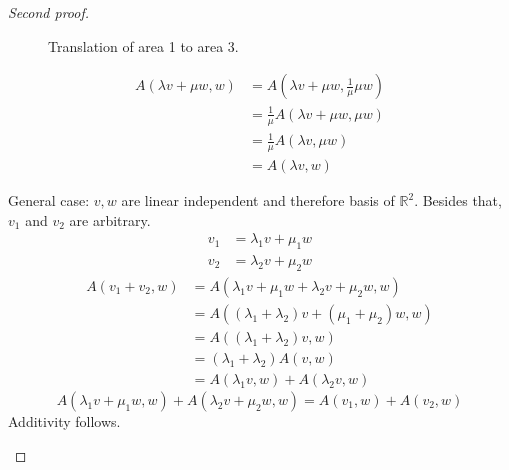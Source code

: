\documentclass[a4paper,landscape,twocolumn]{article}
\begin{document}
\begin{proof}[Second proof]
\begin{enumerate}
\begin{figure}[!h]
\begin{center}
          \caption{Translation of area 1 to area 3.}
          \label{img:pt}
        \end{center}
      \end{figure}
      \begin{align*}
        A(\lambda v + \mu w, w)
          &= A(\lambda v + \mu w, \frac{1}{\mu} \mu w) \\
          &= \frac1\mu A(\lambda v + \mu w, \mu w) \\
          &= \frac{1}{\mu} A(\lambda v, \mu w) \\
          &= A(\lambda v, w)
      \end{align*}

      General case: $v, w$ are linear independent and therefore basis of $\mathbb R^2$.
      Besides that, $v_1$ and $v_2$ are arbitrary.
      \begin{align*}
        v_1 &= \lambda_1 v + \mu_1 w \\
        v_2 &= \lambda_2 v + \mu_2 w
      \end{align*}
      \begin{align*}
        A(v_1 + v_2, w)
          &= A(\lambda_1 v + \mu_1 w + \lambda_2 v + \mu_2 w, w) \\
          &= A((\lambda_1 + \lambda_2) v + (\mu_1 + \mu_2) w, w) \\
          &= A((\lambda_1 + \lambda_2) v, w) \\
          &= (\lambda_1 + \lambda_2) A(v, w) \\
          &= A(\lambda_1 v, w) + A(\lambda_2 v, w)
      \end{align*}
      \[ A(\lambda_1 v + \mu_1 w, w) + A(\lambda_2 v + \mu_2 w, w) = A(v_1, w) + A(v_2, w) \]
      Additivity follows.
  \end{enumerate}
\end{proof}
\end{document}
